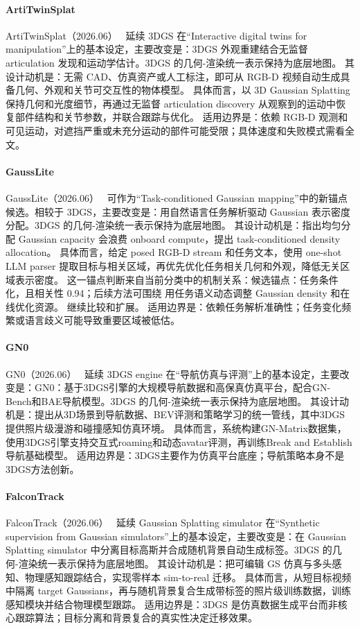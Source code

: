 \paragraph{ArtiTwinSplat}
ArtiTwinSplat（2026.06）~\cite{2606_24628} 延续 3DGS 在“Interactive digital twins for manipulation”上的基本设定，主要改变是：3DGS 外观重建结合无监督 articulation 发现和运动学估计。3DGS 的几何-渲染统一表示保持为底层地图。
其设计动机是：无需 CAD、仿真资产或人工标注，即可从 RGB-D 视频自动生成具备几何、外观和关节可交互性的物体模型。
具体而言，以 3D Gaussian Splatting 保持几何和光度细节，再通过无监督 articulation discovery 从观察到的运动中恢复部件结构和关节参数，并联合跟踪与优化。
适用边界是：依赖 RGB-D 观测和可见运动，对遮挡严重或未充分运动的部件可能受限；具体速度和失败模式需看全文。

\paragraph{GaussLite}
GaussLite（2026.06）~\cite{2606_30809} 可作为“Task-conditioned Gaussian mapping”中的新锚点候选。相较于 3DGS，主要改变是：用自然语言任务解析驱动 Gaussian 表示密度分配。3DGS 的几何-渲染统一表示保持为底层地图。
其设计动机是：指出均匀分配 Gaussian capacity 会浪费 onboard compute，提出 task-conditioned density allocation。
具体而言，给定 posed RGB-D stream 和任务文本，使用 one-shot LLM parser 提取目标与相关区域，再优先优化任务相关几何和外观，降低无关区域表示密度。
这一锚点判断来自当前分类中的机制关系：候选锚点：任务条件化，且相关性 0.94；后续方法可围绕 用任务语义动态调整 Gaussian density 和在线优化资源。 继续比较和扩展。
适用边界是：依赖任务解析准确性；任务变化频繁或语言歧义可能导致重要区域被低估。

\paragraph{GN0}
GN0（2026.06）~\cite{2606_03682} 延续 3DGS engine 在“导航仿真与评测”上的基本设定，主要改变是：GN0：基于3DGS引擎的大规模导航数据和高保真仿真平台，配合GN-Bench和BAE导航模型。3DGS 的几何-渲染统一表示保持为底层地图。
其设计动机是：提出从3D场景到导航数据、BEV评测和策略学习的统一管线，其中3DGS提供照片级漫游和碰撞感知仿真环境。
具体而言，系统构建GN-Matrix数据集，使用3DGS引擎支持交互式roaming和动态avatar评测，再训练Break and Establish导航基础模型。
适用边界是：3DGS主要作为仿真平台底座；导航策略本身不是3DGS方法创新。

\paragraph{FalconTrack}
FalconTrack（2026.06）~\cite{2606_29783} 延续 Gaussian Splatting simulator 在“Synthetic supervision from Gaussian simulators”上的基本设定，主要改变是：在 Gaussian Splatting simulator 中分离目标高斯并合成随机背景自动生成标签。3DGS 的几何-渲染统一表示保持为底层地图。
其设计动机是：把可编辑 GS 仿真与多头感知、物理感知跟踪结合，实现零样本 sim-to-real 迁移。
具体而言，从短目标视频中隔离 target Gaussians，再与随机背景复合生成带标签的照片级训练数据，训练感知模块并结合物理模型跟踪。
适用边界是：3DGS 是仿真数据生成平台而非核心跟踪算法；目标分离和背景复合的真实性决定迁移效果。

